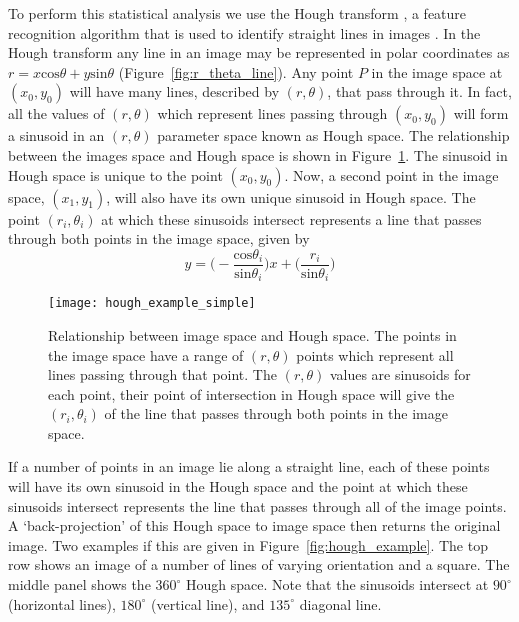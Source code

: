 To perform this statistical analysis we use the Hough transform \citep{hough1961}, a feature recognition algorithm that is used to identify straight lines in images \citep{duda1972}. In the Hough transform any line in an image may be represented in polar coordinates as $r=x\mathrm{cos}\theta +y\mathrm{sin}\theta$ (Figure~\ref{fig:r_theta_line}). Any point $P$ in the image space at $(x_0, y_0)$ will have many lines, described by $(r,\theta)$, that pass through it. In fact, all the values of $(r, \theta)$ which represent lines passing through $(x_0, y_0)$ will form a sinusoid in an $(r,\theta)$ parameter space known as Hough space. The relationship between the images space and Hough space is shown in Figure~\ref{fig:image_hough}. The sinusoid in Hough space is unique to the point $(x_0, y_0)$. Now, a second point in the image space, $(x_1, y_1)$, will also have its own unique sinusoid in Hough space. The point $(r_i,\theta_i)$ at which these sinusoids intersect represents a line that passes through both points in the image space, given by
\begin{equation}
y = \bigg(- \frac{\mathrm{cos}\theta_i}{\mathrm{sin}\theta_i}\bigg)x + \bigg(\frac{r_i}{\mathrm{sin}\theta_i}\bigg)
\end{equation}
\begin{figure}[t!]
\begin{center}
\texttt{[image: hough\_example\_simple]}
\caption[Relationship between image space and Hough space]{Relationship between image space and Hough space. The points in the image space have a range of $(r, \theta)$ points which represent all lines passing through that point. The $(r,\theta)$ values are sinusoids for each point, their point of intersection in Hough space will give the $(r_i, \theta_i)$ of the line that passes through both points in the image space.}
\label{fig:image_hough}
\end{center}
\end{figure}
If a number of points in an image lie along a straight line, each of these points will have its own sinusoid in the Hough space and the point at which these sinusoids intersect represents the line that passes through all of the image points. A `back-projection' of this Hough space to image space then returns the original image. Two examples if this are given in Figure~\ref{fig:hough_example}. The top row shows an image of a number of lines of varying orientation and a square. The middle panel shows the $360^{\circ}$ Hough space. Note that the sinusoids intersect at $90^{\circ}$ (horizontal lines), $180^{\circ}$ (vertical line), and $135^{\circ}$ diagonal line. 

